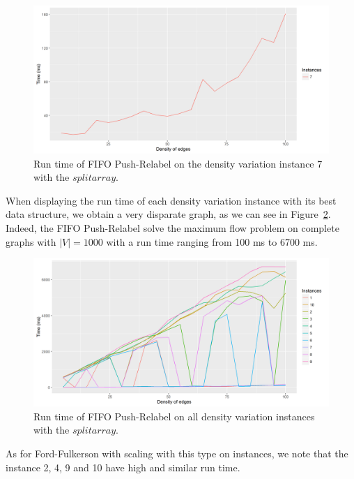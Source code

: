 \begin{figure}[H]
\begin{center}
\includegraphics[scale=0.45]{images/results/pri7.png}
\caption{Run time of FIFO Push-Relabel on the density variation instance 7 with the $split array$.}
\label{fig:PR7}
\end{center}
\end{figure}
When displaying the run time of each density variation instance with its best data structure, we obtain a very disparate graph, as we can see in Figure~\ref{fig:PRmean}. Indeed, the FIFO Push-Relabel solve the maximum flow problem on complete graphs with $|V|=1000$ with a run time ranging from 100 ms to 6700 ms.
\begin{figure}[H]
\begin{center}
\includegraphics[scale=0.45]{images/results/PRmean.png}
\caption{Run time of FIFO Push-Relabel on all density variation instances with the $split array$.}
\label{fig:PRmean}
\end{center}
\end{figure}

As for Ford-Fulkerson with scaling with this type on instances, we note that the instance 2, 4, 9 and 10 have high and similar run time.
